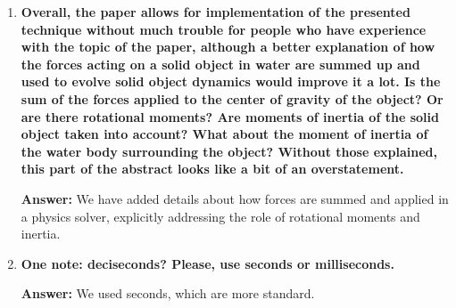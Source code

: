 \documentclass{article}
\newcommand{\answer}[1]{\textbf{\textcolor{answercolor}{Answer:}} \textcolor{answercolor}{#1}}
\begin{document}
\begin{enumerate}[label=\textbf{\arabic*.}]
\begin{enumerate}[label=\textbf{\arabic*.}]
		            \answer{Thank you for the thoughtful suggestion. Using per-gridpoint signed differences based on the incompressibility of water is indeed a more realistic approach and could significantly enhance the accuracy of wave generation. However, we chose our current approximation to prioritize simplicity and straightforward implementation, which aligns better with the real-time constraints and accessibility goals of Arc Blanc. We will certainly consider your suggestion for future enhancements.}

		      \item \textbf{Mask movement and orientation used in the paper, so that the front of the mask is above the water surface and the back is below the water surface, looks artificial and extremely simplified. A propulsion force acting on the hull and causing it to move, in conjunction with proper water-to-solid interaction from the first part of the paper, with its forces and moments, will naturally cause the hull to raise its bow based on a physically correct simulation instead of the oversimplified approximation used in the paper.}

		            \answer{Thank you for your valuable proposition. It might be a nice refinement for the Arc Blanc framework.}
	      \end{enumerate}

	\item \textbf{Overall, the paper allows for implementation of the presented technique without much trouble for people who have experience with the topic of the paper, although a better explanation of how the forces acting on a solid object in water are summed up and used to evolve solid object dynamics would improve it a lot. Is the sum of the forces applied to the center of gravity of the object? Or are there rotational moments? Are moments of inertia of the solid object taken into account? What about the moment of inertia of the water body surrounding the object? Without those explained, this part of the abstract looks like a bit of an overstatement.}

	      \answer{We have added details about how forces are summed and applied in a physics solver, explicitly addressing the role of rotational moments and inertia.}

	\item \textbf{One note: deciseconds? Please, use seconds or milliseconds.}

	      \answer{We used seconds, which are more standard.}


\end{enumerate}
\end{document}
